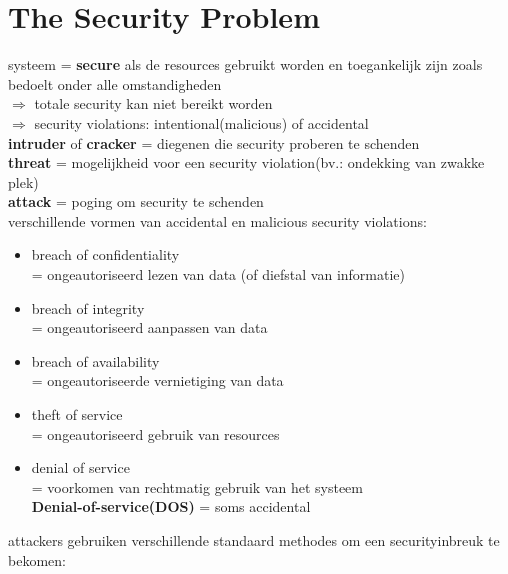 \documentclass{report}
\begin{document}
\section{The Security Problem}
systeem = \textbf{secure} als de resources gebruikt worden en toegankelijk zijn zoals bedoelt onder alle omstandigheden
\\$\Rightarrow$ totale security kan niet bereikt worden
\\$\Rightarrow$ security violations: intentional(malicious) of accidental
\\\textbf{intruder} of \textbf{cracker} = diegenen die security proberen te schenden
\\\textbf{threat} = mogelijkheid voor een security violation(bv.: ondekking van zwakke plek)
\\\textbf{attack} = poging om security te schenden
\\verschillende vormen van accidental en malicious security violations:
\begin{itemize}
\item breach of confidentiality
\\= ongeautoriseerd lezen van data (of diefstal van informatie)
\item breach of integrity
\\= ongeautoriseerd aanpassen van data
\item breach of availability
\\= ongeautoriseerde vernietiging van data
\item theft of service
\\ = ongeautoriseerd gebruik van resources
\item denial of service
\\= voorkomen van rechtmatig gebruik van het systeem
\\\textbf{Denial-of-service(DOS)} = soms accidental
\end{itemize}
attackers gebruiken verschillende standaard methodes om een securityinbreuk te bekomen:
\end{document}
